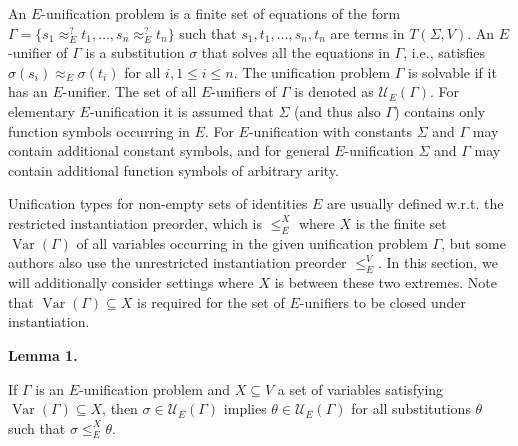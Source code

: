  
 
An $E$-unification problem is a finite set of equations of the form $\Gamma=\{s_{1}\approx_{E}^{?}t_{1},\ldots,s_{n}\approx_{E}^{?}t_{n}\}$ such that $s_{1},t_{1},\ldots,s_{n},t_{n}$ are terms in $T(\Sigma,V)$. An $E$-unifier of $\Gamma$ is a substitution $\sigma$ that solves all the equations in $\Gamma$, i.e., satisfies $\sigma(s_{i})\approx_{E}\sigma(t_{i})$ for all $i,1\leq i\leq n$. The unification problem $\Gamma$ is solvable if it has an $E$-unifier. The set of all $E$-unifiers of $\Gamma$ is denoted as $\mathcal{U}_{E}(\Gamma)$. For elementary $E$-unification it is assumed that $\Sigma$ (and thus also $\Gamma$) contains only function symbols occurring in $E$. For $E$-unification with constants $\Sigma$ and $\Gamma$ may contain additional constant symbols, and for general $E$-unification $\Sigma$ and $\Gamma$ may contain additional function symbols of arbitrary arity.\par
 
 
 
Unification types for non-empty sets of identities $E$ are usually defined w.r.t. the restricted instantiation preorder, which is $\leq_{E}^{X}$ where $X$ is the finite set $\operatorname{Var}(\Gamma)$ of all variables occurring in the given unification problem $\Gamma$, but some authors also use the unrestricted instantiation preorder $\leq_{E}^{V}$. In this section, we will additionally consider settings where $X$ is between these two extremes. Note that $\operatorname{Var}(\Gamma)\subseteq X$ is required for the set of $E$-unifiers to be closed under instantiation.\par
 
 
 
\par\medskip\noindent\textbf{Lemma 1.}\par
 
 
If $\Gamma$ is an $E$-unification problem and $X\subseteq V$ a set of variables satisfying $\operatorname{Var}(\Gamma)\subseteq X$, then $\sigma\in\mathcal{U}_{E}(\Gamma)$ implies $\theta\in\mathcal{U}_{E}(\Gamma)$ for all substitutions $\theta$ such that $\sigma\leq_{E}^{X}\theta$.\par
 
 
